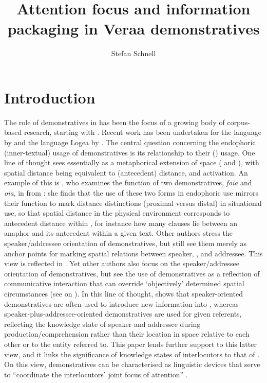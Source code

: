 \documentclass[output=paper
,modfonts
,nonflat]{langsci/langscibook}
\title{Attention focus and information packaging in Vera{\textquotesingle}a demonstratives}
\author{Stefan Schnell\affiliation{Centre of Excellence for the Dynamics of Language \& University of Melbourne}}
\begin{document}
\maketitle
\section{Introduction} 
The role of demonstratives in  has been the focus of a growing body of corpus-based research, starting with \cite{Himmelmann1996}. Recent work has been undertaken for the  language  by \cite{Cutfield2012} and the  language Logea by \cite{Dawuda2009}. The central question concerning the endophoric (inner-textual) usage of demonstratives is its relationship to their  () usage. One line of thought sees  essentially as a metaphorical extension of space (\cite{Diessel1999} and \cite[121]{Buehler1934}), with spatial distance being equivalent to  (antecedent) distance, and  activation. An example of this is \cite{Terrill2001}, who examines the function of two demonstratives, \textit{foia} and \textit{oia}, in  from : she finds that the use of these two forms in endophoric use mirrors their function to mark distance distinctions (proximal versus distal) in situational use, so that spatial distance in the physical environment corresponds to antecedent distance within , for instance how many clauses lie between an anaphor and its antecedent within a given text. Other authors stress the speaker/addressee orientation of demonstratives, but still see them merely as anchor points for marking spatial relations between speaker, , and addressee. This view is reflected in \cite{Margetts2004}. Yet other authors also focus on the speaker/addressee orientation of demonstratives, but see the use of demonstratives as a reflection of communicative interaction that can override `objectively' determined spatial circumstances (see \citealt{Enfield2003} on ). In this line of thought, \cite{Mosel2004} shows that  speaker-oriented demonstratives are often used to introduce new information into , whereas speaker-plus-addressee-oriented demonstratives are used for given referents, reflecting the knowledge state of speaker and addressee during  production/comprehension rather than their location in space relative to each other or to the entity referred to. This paper lends further support to this latter view, and it links the significance of knowledge states of interlocutors to that of . On this view, demonstratives can be characterised as linguistic devices that serve to ``coordinate the interlocutors' joint focus of attention'' \citep[481]{Diessel2006}.
\end{document}
